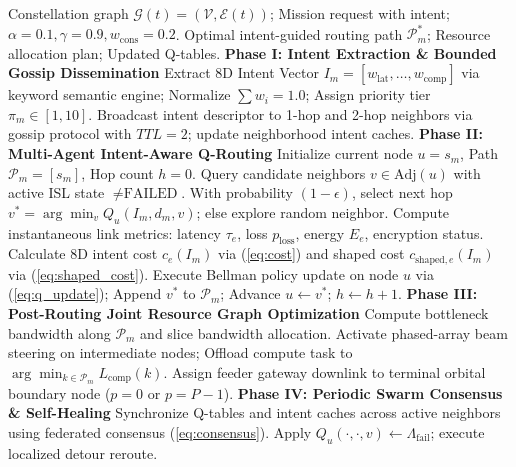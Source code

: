 \documentclass[journal]{IEEEtran}
\begin{document}
\begin{algorithm}[t]
\caption{I-MACSI End-to-End Cognitive Swarm Execution Pipeline}
\label{algo:imacsi}
\begin{algorithmic}[1]
\REQUIRE Constellation graph $\mathcal{G}(t)=(\mathcal{V}, \mathcal{E}(t))$; Mission request with intent; $\alpha=0.1, \gamma=0.9, w_{\text{cons}}=0.2$.
\ENSURE Optimal intent-guided routing path $\mathcal{P}_m^*$; Resource allocation plan; Updated Q-tables.
\STATE \textbf{Phase I: Intent Extraction \& Bounded Gossip Dissemination}
\STATE Extract 8D Intent Vector $I_m = [w_{\text{lat}}, \dots, w_{\text{comp}}]$ via keyword semantic engine; Normalize $\sum w_i = 1.0$; Assign priority tier $\pi_m \in [1, 10]$.
\STATE Broadcast intent descriptor to 1-hop and 2-hop neighbors via gossip protocol with $TTL=2$; update neighborhood intent caches.
\STATE \textbf{Phase II: Multi-Agent Intent-Aware Q-Routing}
\STATE Initialize current node $u = s_m$, Path $\mathcal{P}_m = [s_m]$, Hop count $h = 0$.
    \STATE Query candidate neighbors $v \in \text{Adj}(u)$ with active ISL state $\ne \text{FAILED}$.
    \STATE With probability $(1 - \epsilon)$, select next hop $v^* = \arg\min_v Q_u(I_m, d_m, v)$; else explore random neighbor.
    \STATE Compute instantaneous link metrics: latency $\tau_e$, loss $p_{\text{loss}}$, energy $E_e$, encryption status.
    \STATE Calculate 8D intent cost $c_e(I_m)$ via (\ref{eq:cost}) and shaped cost $c_{\text{shaped},e}(I_m)$ via (\ref{eq:shaped_cost}).
    \STATE Execute Bellman policy update on node $u$ via (\ref{eq:q_update}); Append $v^*$ to $\mathcal{P}_m$; Advance $u \leftarrow v^*$; $h \leftarrow h + 1$.
\ENDWHILE
\STATE \textbf{Phase III: Post-Routing Joint Resource Graph Optimization}
\STATE Compute bottleneck bandwidth along $\mathcal{P}_m$ and slice bandwidth allocation.
\STATE Activate phased-array beam steering on intermediate nodes; Offload compute task to $\arg\min_{k \in \mathcal{P}_m} L_{\text{comp}}(k)$.
\STATE Assign feeder gateway downlink to terminal orbital boundary node ($p=0$ or $p=P-1$).
\STATE \textbf{Phase IV: Periodic Swarm Consensus \& Self-Healing}
    \STATE Synchronize Q-tables and intent caches across active neighbors using federated consensus (\ref{eq:consensus}).
\ENDIF
{}
    \STATE Apply $Q_u(\cdot, \cdot, v) \leftarrow \Lambda_{\text{fail}}$; execute localized detour reroute.
\ENDIF
\end{algorithmic}
\end{algorithm}
\end{document}
